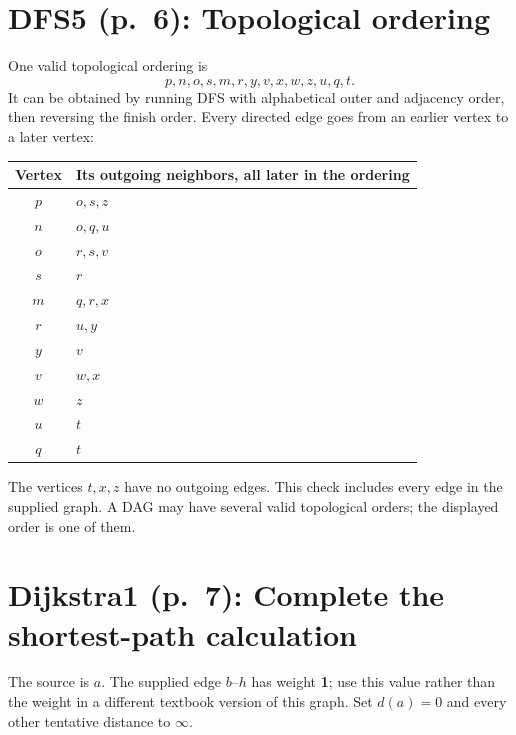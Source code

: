 \documentclass[11pt,a4paper]{article}
\newcommand{\question}[2]{\section*{#1: #2}}
\begin{document}
\newpage
\question{DFS5 (p.\ 6)}{Topological ordering}
One valid topological ordering is
\[
\boxed{p,n,o,s,m,r,y,v,x,w,z,u,q,t}.
\]
It can be obtained by running DFS with alphabetical outer and adjacency order, then reversing the finish order. Every directed edge goes from an earlier vertex to a later vertex:
\begin{center}\begin{tabular}{c|l}\toprule
Vertex&Its outgoing neighbors, all later in the ordering\\\midrule
$p$&$o,s,z$\\$n$&$o,q,u$\\$o$&$r,s,v$\\$s$&$r$\\$m$&$q,r,x$\\$r$&$u,y$\\$y$&$v$\\$v$&$w,x$\\$w$&$z$\\$u$&$t$\\$q$&$t$\\\bottomrule\end{tabular}\end{center}
The vertices $t,x,z$ have no outgoing edges. This check includes every edge in the supplied graph. A DAG may have several valid topological orders; the displayed order is one of them.

\newpage
\question{Dijkstra1 (p.\ 7)}{Complete the shortest-path calculation}
The source is $a$. The supplied edge $b$--$h$ has weight \textbf{1}; use this value rather than the weight in a different textbook version of this graph. Set $d(a)=0$ and every other tentative distance to $\infty$.
\end{document}

